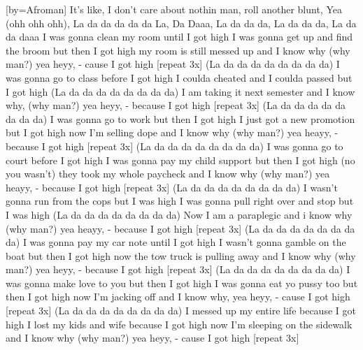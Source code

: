 [by={Afroman}]
\beginverse*\singlespacing
It's like, I don't care about nothin man,
roll another blunt, Yea (ohh ohh ohh),
\endverse
\beginverse*\singlespacing
La da da da da da La, Da Daaa,
La da da da, La da da da, La da da daaa
\endverse
\beginverse*\singlespacing
I was gonna clean my room until I got high
I was gonna get up and find the broom but then I got high
my room is still messed up and I know why (why man?) yea heyy,
- cause I got high [repeat 3x]
\endverse
\beginverse*\singlespacing
(La da da da da da da da da)
\endverse
\beginverse*\singlespacing
I was gonna go to class before I got high
I coulda cheated and I coulda passed but I got high
(La da da da da da da da da)
I am taking it next semester and I know why, (why man?) yea heyy,
- because I got high [repeat 3x]
\endverse
\beginverse*\singlespacing
(La da da da da da da da da)
\endverse
\beginverse*\singlespacing
I was gonna go to work but then I got high
I just got a new promotion but I got high
now I'm selling dope and I know why (why man?) yea heayy,
- because I got high [repeat 3x]
\endverse
\beginverse*\singlespacing
(La da da da da da da da da)
\endverse
\beginverse*\singlespacing
I was gonna go to court before I got high
I was gonna pay my child support but then I got high (no you wasn't)
they took my whole paycheck and I know why (why man?) yea heayy,
- because I got high [repeat 3x]
\endverse
\beginverse*\singlespacing
(La da da da da da da da da)
\endverse
\beginverse*\singlespacing
I wasn't gonna run from the cops but I was high
I was gonna pull right over and stop but I was high
(La da da da da da da da da)
Now I am a paraplegic and i know why (why man?) yea heayy,
- because I got high [repeat 3x]
\endverse
\beginverse*\singlespacing
(La da da da da da da da da)
\endverse
\beginverse*\singlespacing
I was gonna pay my car note until I got high
I wasn't gonna gamble on the boat but then I got high
now the tow truck is pulling away and I know why (why man?) yea heyy,
- because I got high [repeat 3x]
\endverse
\beginverse*\singlespacing
(La da da da da da da da da)
\endverse
\beginverse*\singlespacing
I was gonna make love to you but then I got high
I was gonna eat yo pussy too but then I got high
now I'm jacking off and I know why, yea heyy,
- cause I got high [repeat 3x]
\endverse
\beginverse*\singlespacing
(La da da da da da da da da)
\endverse
\beginverse*\singlespacing
I messed up my entire life because I got high
I lost my kids and wife because I got high
now I'm sleeping on the sidewalk and I know why (why man?) yea heyy,
- cause I got high [repeat 3x]
